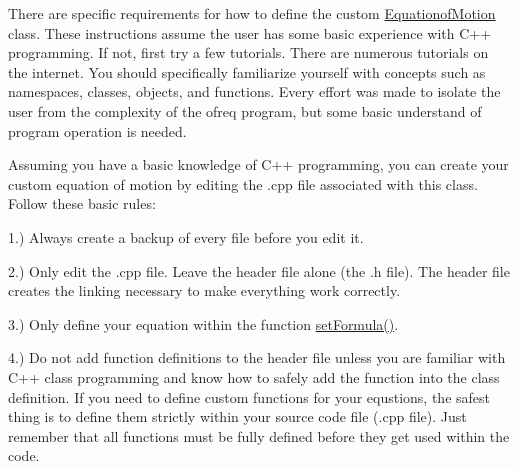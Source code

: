 There are specific requirements for how to define the custom \hyperlink{classosea_1_1ofreq_1_1_equationof_motion}{Equationof\-Motion} class. These instructions assume the user has some basic experience with C++ programming. If not, first try a few tutorials. There are numerous tutorials on the internet. You should specifically familiarize yourself with concepts such as namespaces, classes, objects, and functions. Every effort was made to isolate the user from the complexity of the ofreq program, but some basic understand of program operation is needed.

Assuming you have a basic knowledge of C++ programming, you can create your custom equation of motion by editing the .cpp file associated with this class. Follow these basic rules\-:

1.) Always create a backup of every file before you edit it.

2.) Only edit the .cpp file. Leave the header file alone (the .h file). The header file creates the linking necessary to make everything work correctly.

3.) Only define your equation within the function \hyperlink{classosea_1_1ofreq_1_1_eqn_rotation_a910975e9e2e8d438853a4e7d658850a8}{set\-Formula()}.

4.) Do not add function definitions to the header file unless you are familiar with C++ class programming and know how to safely add the function into the class definition. If you need to define custom functions for your equstions, the safest thing is to define them strictly within your source code file (.cpp file). Just remember that all functions must be fully defined before they get used within the code.

